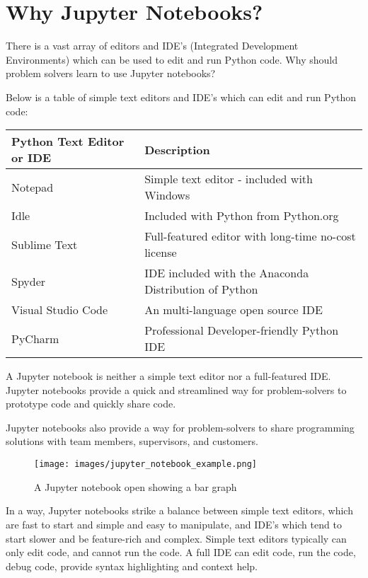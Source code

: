 \documentclass{book}
\makeatletter
\def\maxwidth{\ifdim\Gin@nat@width>\linewidth\linewidth
\else\Gin@nat@width\fi}
\let\Oldincludegraphics\includegraphics
\renewcommand{\includegraphics}[1]{\Oldincludegraphics[width=.8\maxwidth]{#1}}
\makeatother
\begin{document}
    
        \hypertarget{why-jupyter-notebooks}{%
\section{Why Jupyter Notebooks?}\label{why-jupyter-notebooks}}
    




    
        There is a vast array of editors and IDE's (Integrated Development
Environments) which can be used to edit and run Python code. Why should
problem solvers learn to use Jupyter notebooks?

Below is a table of simple text editors and IDE's which can edit and run
Python code:

\begin{longtable}[]{@{}ll@{}}
\toprule
Python Text Editor or IDE & Description\tabularnewline
\midrule
\endhead
Notepad & Simple text editor - included with Windows\tabularnewline
Idle & Included with Python from Python.org\tabularnewline
Sublime Text & Full-featured editor with long-time no-cost
license\tabularnewline
Spyder & IDE included with the Anaconda Distribution of
Python\tabularnewline
Visual Studio Code & An multi-language open source IDE\tabularnewline
PyCharm & Professional Developer-friendly Python IDE\tabularnewline
\bottomrule
\end{longtable}

A Jupyter notebook is neither a simple text editor nor a full-featured
IDE. Jupyter notebooks provide a quick and streamlined way for
problem-solvers to prototype code and quickly share code.

Jupyter notebooks also provide a way for problem-solvers to share
programming solutions with team members, supervisors, and customers.

\begin{figure}
\centering
\texttt{[image: images/jupyter\_notebook\_example.png]}
\caption{A Jupyter notebook open showing a bar graph}
\end{figure}

In a way, Jupyter notebooks strike a balance between simple text
editors, which are fast to start and simple and easy to manipulate, and
IDE's which tend to start slower and be feature-rich and complex. Simple
text editors typically can only edit code, and cannot run the code. A
full IDE can edit code, run the code, debug code, provide syntax
highlighting and context help.
    
\end{document}
